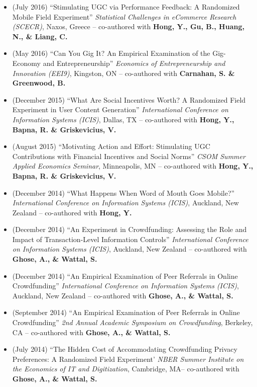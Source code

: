 \documentclass[10.5pt,letterpaper,sans]{moderncv}        %
\begin{document}
\begin{itemize}
\item (July 2016) ``Stimulating UGC via Performance Feedback: A Randomized Mobile Field Experiment'' \textit{Statistical Challenges in eCommerce Research (SCECR)}, Naxos, Greece -- co-authored with \textbf{Hong, Y., Gu, B., Huang, N., \& Liang, C.}

\item (May 2016) ``Can You Gig It? An Empirical Examination of the Gig-Economy and Entrepreneurship'' \textit{Economics of Entrepreneurship and Innovation (EEI9)}, Kingston, ON -- co-authored with \textbf{Carnahan, S. \& Greenwood, B.}

\item (December 2015) ``What Are Social Incentives Worth? A Randomized Field Experiment in User Content Generation'' \textit{International Conference on Information Systems (ICIS)}, Dallas, TX -- co-authored with \textbf{Hong, Y., Bapna, R. \& Griskevicius, V.}

\item (August 2015) ``Motivating Action and Effort: Stimulating UGC Contributions with Financial Incentives and Social Norms'' \textit{CSOM Summer Applied Economics Seminar}, Minneapolis, MN -- co-authored with \textbf{Hong, Y., Bapna, R. \& Griskevicius, V.}

\item (December 2014) ``What Happens When Word of Mouth Goes Mobile?'' \textit{International Conference on Information Systems (ICIS)}, Auckland, New Zealand -- co-authored with \textbf{Hong, Y.}

\item (December 2014) ``An Experiment in Crowdfunding: Assessing the Role and Impact of Transaction-Level Information Controls'' \textit{International Conference on Information Systems (ICIS)}, Auckland, New Zealand -- co-authored with \textbf{Ghose, A., \& Wattal, S.}

\item (December 2014) ``An Empirical Examination of Peer Referrals in Online Crowdfunding'' \textit{International Conference on Information Systems (ICIS)}, Auckland, New Zealand -- co-authored with \textbf{Ghose, A., \& Wattal, S.}

\item (September 2014) ``An Empirical Examination of Peer Referrals in Online Crowdfunding'' \textit{2nd Annual Academic Symposium on Crowdfunding}, Berkeley, CA -- co-authored with \textbf{Ghose, A., \& Wattal, S.}

\item (July 2014) ``The Hidden Cost of Accommodating Crowdfunding Privacy Preferences: A Randomized Field Experiment' \textit{NBER Summer Institute on the Economics of IT and Digitization}, Cambridge, MA-- co-authored with \textbf{Ghose, A., \& Wattal, S.}


\end{itemize}
\end{document}
